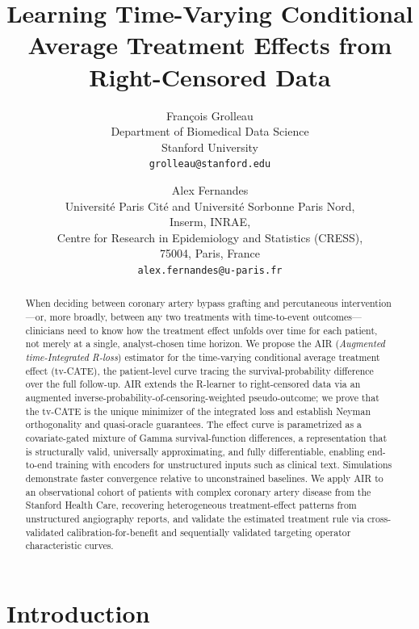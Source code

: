 \documentclass{article}
\title{Learning Time-Varying Conditional Average Treatment Effects from Right-Censored Data}
\author{%
  François Grolleau\\
  Department of Biomedical Data Science\\
  Stanford University\\
  \texttt{grolleau@stanford.edu}
  \and
  Alex Fernandes\\
  Université Paris Cité and Université Sorbonne Paris Nord,\\
  Inserm, INRAE,\\
  Centre for Research in Epidemiology and Statistics (CRESS),\\
  75004, Paris, France\\
  \texttt{alex.fernandes@u-paris.fr}
}
\begin{document}
\maketitle

\begin{abstract}
When deciding between coronary artery bypass grafting and percutaneous intervention---or, more broadly, between any two treatments with time-to-event outcomes---clinicians need to know how the treatment effect unfolds over time for each patient, not merely at a single, analyst-chosen time horizon.
We propose the AIR (\textit{Augmented time-Integrated R-loss}) estimator for the time-varying conditional average treatment effect (tv-CATE), the patient-level curve tracing the survival-probability difference over the full follow-up.
AIR extends the R-learner to right-censored data via an augmented inverse-probability-of-censoring-weighted pseudo-outcome; we prove that the tv-CATE is the unique minimizer of the integrated loss and establish Neyman orthogonality and quasi-oracle guarantees.
The effect curve is parametrized as a covariate-gated mixture of Gamma survival-function differences, a representation that is structurally valid, universally approximating, and fully differentiable, enabling end-to-end training with encoders for unstructured inputs such as clinical text.
Simulations demonstrate faster convergence relative to unconstrained baselines.
We apply AIR to an observational cohort of patients with complex coronary artery disease from the Stanford Health Care, recovering heterogeneous treatment-effect patterns from unstructured angiography reports, and validate the estimated treatment rule via cross-validated calibration-for-benefit and sequentially validated targeting operator characteristic curves.
\end{abstract}

\section{Introduction}
\end{document}

